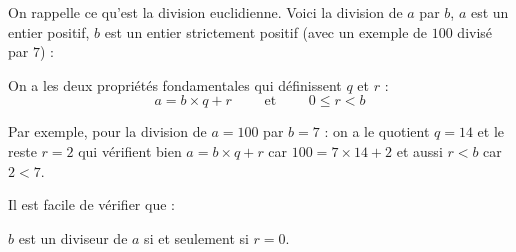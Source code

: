\documentclass[11pt,class=report,crop=false]{standalone}
\begin{document}




\begin{cours}[Arithmétique]

\index{\ci{//}}
\index{\ci{\%}}

On rappelle ce qu'est la division euclidienne. Voici la division de $a$ par $b$, $a$ est un entier positif, $b$ est un entier strictement positif (avec un exemple de $100$ divisé par $7$) :


On a les deux propriétés fondamentales qui définissent $q$ et $r$ :
$$a = b \times q  + r \qquad \text{ et } \qquad 0 \le r < b$$

Par exemple, pour la division de $a=100$ par $b=7$ : on a le quotient $q=14$ et le reste $r=2$ qui vérifient bien $a = b \times q  + r$ car $100 = 7 \times 14 + 2$  et aussi $r<b$ car $2<7$.


Il est facile de vérifier que :\\
\centerline{$b$ est un diviseur de $a$ si et seulement si $r=0$.}

\end{cours}


\end{document}

